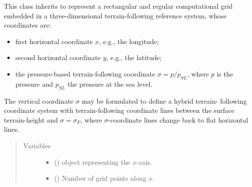 \documentclass[letterpaper,10pt,english]{sphinxmanual}
\begin{document}

\begin{fulllineitems}
\label{\detokenize{api:grids.sigma.Sigma3d}}
This class inherits {\hyperref[\detokenize{api:grids.xyz_grid.XYZGrid}]{}} to represent a rectangular and regular
computational grid embedded in a three-dimensional terrain-following reference system, whose
coordinates are:
\begin{itemize}
\item {} 
first horizontal coordinate \(x\), e.g., the longitude;

\item {} 
second horizontal coordinate \(y\), e.g., the latitude;

\item {} 
the pressure-based terrain-following coordinate \(\sigma = p / p_{SL}\),                  where \(p\) is the pressure and \(p_{SL}\) the pressure at the                  sea level.

\end{itemize}

The vertical coordinate \(\sigma\) may be formulated to define a hybrid terrain-
following coordinate system with terrain-following coordinate lines between the
surface terrain-height and \(\sigma = \sigma_F\), where \(\sigma\)-coordinate
lines change back to flat horizontal lines.
\begin{quote}\begin{description}
\item[{Variables}] \leavevmode\begin{itemize}
\item {} 
{\hyperref[\detokenize{api:grids.xyz_grid.XYZGrid.x}]{}} () \textendash{} {\hyperref[\detokenize{api:grids.axis.Axis}]{}} object representing the \(x\)-axis.

\item {} 
{\hyperref[\detokenize{api:grids.xyz_grid.XYZGrid.nx}]{}} () \textendash{} Number of grid points along \(x\).


\end{itemize}
\end{description}
\end{quote}
\end{fulllineitems}
\end{document}
